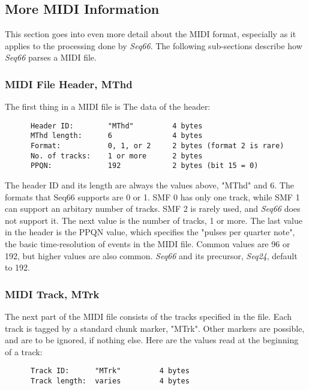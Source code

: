 \subsection{More MIDI Information}
\label{subsec:midi_information_more}

   This section goes into even more detail about the MIDI format, especially as
   it applies to the processing done by \textsl{Seq66}.
   The following sub-sections describe how \textsl{Seq66}
   parses a MIDI file.

\subsubsection{MIDI File Header, MThd}
\label{subsubsec:midi_format_header}

   The first thing in a MIDI file is The data of the header:

   \begin{verbatim}
      Header ID:        "MThd"         4 bytes
      MThd length:      6              4 bytes
      Format:           0, 1, or 2     2 bytes (format 2 is rare)
      No. of tracks:    1 or more      2 bytes
      PPQN:             192            2 bytes (bit 15 = 0)
   \end{verbatim}

   The header ID and its length are always the values above, "MThd" and 6.
   The formats that Seq66 supports are 0 or 1.
   SMF 0 has only one track, while SMF 1 can
   support an arbitary number of tracks.
   SMF 2 is rarely used, and \textsl{Seq66} does not support it.
   The next value is the number of tracks, 1 or more.
   The last value in the header is the
   PPQN value, which specifies the "pulses per quarter note", the
   basic time-resolution of events in the MIDI file.  Common values are 96 or
   192, but higher values are also common.
   \textsl{Seq66} and its precursor,
   \textsl{Seq24}, default to 192.

\subsubsection{MIDI Track, MTrk}
\label{subsubsec:midi_format_track}

   The next part of the MIDI file consists of the tracks specified in the file.
   Each track is tagged by
   a standard chunk marker, "MTrk".  Other markers are possible, and are to be
   ignored, if nothing else.  Here are the values read at the beginning of a
   track:

   \begin{verbatim}
      Track ID:      "MTrk"         4 bytes
      Track length:  varies         4 bytes
   \end{verbatim}


